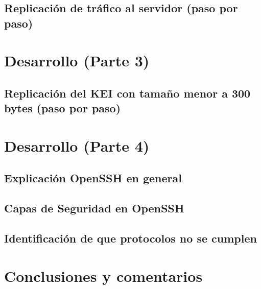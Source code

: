 \documentclass[letter,12pt]{article}
\begin{document}
\subsection{Replicación de tráfico al servidor (paso por paso)}

\section{Desarrollo (Parte 3)}

\subsection{Replicación del KEI con tamaño menor a 300 bytes (paso por paso)}

\section{Desarrollo (Parte 4)}
\subsection{Explicación OpenSSH en general}
\subsection{Capas de Seguridad en OpenSSH}
\subsection{Identificación de que protocolos no se cumplen}

\section*{Conclusiones y comentarios}
\end{document}
